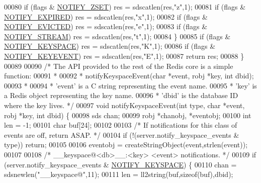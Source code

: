 \begin{DoxyCode}
00080         \textcolor{keywordflow}{if} (flags & \hyperlink{server_8h_ab8516a5a3ff1b9eb5f1cb303abef0d2f}{NOTIFY\_ZSET}) res = sdscatlen(res,\textcolor{stringliteral}{"z"},1);
00081         \textcolor{keywordflow}{if} (flags & \hyperlink{server_8h_a6b6b55f4f6ffcd0b1648395fea5fafc1}{NOTIFY\_EXPIRED}) res = sdscatlen(res,\textcolor{stringliteral}{"x"},1);
00082         \textcolor{keywordflow}{if} (flags & \hyperlink{server_8h_aefeeae0f3ac953537135a902b17bf63d}{NOTIFY\_EVICTED}) res = sdscatlen(res,\textcolor{stringliteral}{"e"},1);
00083         \textcolor{keywordflow}{if} (flags & \hyperlink{server_8h_a045eabb1c5cc4dd02abfbfbae1d27c84}{NOTIFY\_STREAM}) res = sdscatlen(res,\textcolor{stringliteral}{"t"},1);
00084     \}
00085     \textcolor{keywordflow}{if} (flags & \hyperlink{server_8h_ae266f8cd5361f66ffa473badae12ff8f}{NOTIFY\_KEYSPACE}) res = sdscatlen(res,\textcolor{stringliteral}{"K"},1);
00086     \textcolor{keywordflow}{if} (flags & \hyperlink{server_8h_a4db1f9cfaeccf1ee00d27aa50c4e5d1a}{NOTIFY\_KEYEVENT}) res = sdscatlen(res,\textcolor{stringliteral}{"E"},1);
00087     \textcolor{keywordflow}{return} res;
00088 \}
00089 
00090 \textcolor{comment}{/* The API provided to the rest of the Redis core is a simple function:}
00091 \textcolor{comment}{ *}
00092 \textcolor{comment}{ * notifyKeyspaceEvent(char *event, robj *key, int dbid);}
00093 \textcolor{comment}{ *}
00094 \textcolor{comment}{ * 'event' is a C string representing the event name.}
00095 \textcolor{comment}{ * 'key' is a Redis object representing the key name.}
00096 \textcolor{comment}{ * 'dbid' is the database ID where the key lives.  */}
00097 \textcolor{keywordtype}{void} notifyKeyspaceEvent(\textcolor{keywordtype}{int} type, \textcolor{keywordtype}{char} *event, robj *key, \textcolor{keywordtype}{int} dbid) \{
00098     sds chan;
00099     robj *chanobj, *eventobj;
00100     \textcolor{keywordtype}{int} len = -1;
00101     \textcolor{keywordtype}{char} buf[24];
00102 
00103     \textcolor{comment}{/* If notifications for this class of events are off, return ASAP. */}
00104     \textcolor{keywordflow}{if} (!(server.notify\_keyspace\_events & type)) \textcolor{keywordflow}{return};
00105 
00106     eventobj = createStringObject(event,strlen(event));
00107 
00108     \textcolor{comment}{/* \_\_keyspace@<db>\_\_:<key> <event> notifications. */}
00109     \textcolor{keywordflow}{if} (server.notify\_keyspace\_events & \hyperlink{server_8h_ae266f8cd5361f66ffa473badae12ff8f}{NOTIFY\_KEYSPACE}) \{
00110         chan = sdsnewlen(\textcolor{stringliteral}{"\_\_keyspace@"},11);
00111         len = ll2string(buf,\textcolor{keyword}{sizeof}(buf),dbid);

\end{DoxyCode}
